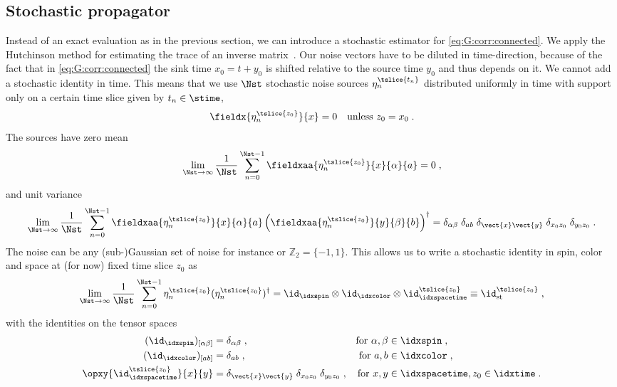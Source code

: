\subsection{Stochastic propagator}
\label{sec:stochastic:prop}

Instead of an exact evaluation as in the previous section, we can introduce a stochastic estimator for \cref{eq:G:corr:connected}.
We apply the Hutchinson method for estimating the trace of an inverse matrix~\cite{Hutchinson01011990,Michael:1998sg}.
Our noise vectors have to be diluted in time-direction, because of the fact that in \cref{eq:G:corr:connected} the sink time $x_0 = t + y_0$ is shifted relative to the source time $y_0$ and thus depends on it.
We cannot add a stochastic identity in time.
This means that we use $\Nst$ stochastic noise sources $\eta_n^{\tslice{t_n}}$ distributed uniformly in time with support only on a certain time slice given by $t_n \in \stime$,
\begin{equation} \label{eq:stoch:time_dilution}
\fieldx{\eta^{\tslice{z_0}}_n}{x} = 0
\quad
\text{unless } z_0 = x_0 \;.
\end{equation}
The sources have zero mean
\begin{equation}
\lim_{\Nst \to \infty}
  \frac{1}{\Nst}
    \sum_{n=0}^{\Nst-1}
      \fieldxaa{\eta^{\tslice{z_0}}_{n}}{x}{\alpha}{a}
 = 0 \;,
\end{equation}
and unit variance
\begin{equation}
\lim_{\Nst \to \infty}
  \frac{1}{\Nst}
    \sum_{n=0}^{\Nst-1}
      \fieldxaa{\eta^{\tslice{z_0}}_{n}}{x}{\alpha}{a}
      \left( \fieldxaa{\eta_n^{\tslice{z_0}}}{y}{\beta}{b} \right)^{\dagger}
=
\delta_{\alpha \beta} \;
\delta_{ab} \;
\delta_{\vect{x} \vect{y}} \;
\delta_{x_0 z_0} \;
\delta_{y_0 z_0} \;.
\end{equation}
The noise can be any (sub-)Gaussian set of noise for instance  or $\mathbb{Z}_2 = \{-1, 1\}$.
This allows us to write a stochastic identity in spin, color and space at (for now) fixed time slice $z_0$ as
\begin{equation} \label{eq:stoch:id}
\lim_{\Nst \to \infty}
  \frac{1}{\Nst}
    \sum_{n=0}^{\Nst-1}
      \eta_n^{\tslice{z_0}}
      (\eta_n^{\tslice{z_0}})^{\dagger}
= \id_{\idxspin} \otimes \id_{\idxcolor} \otimes \id^{\tslice{z_0}}_{\idxspacetime}
\equiv \id^{\tslice{z_0}}_{\text{st}} \;,
\end{equation}
with the identities on the tensor spaces %
\begin{align}
(\id_{\idxspin})_{[\alpha \beta]} &= \delta_{\alpha \beta} \;,
&\text{for } \alpha, \beta &\in \idxspin \;, \\
(\id_{\idxcolor})_{[ab]} &= \delta_{ab} \;,
&\text{for } a, b &\in \idxcolor \;, \\
\opxy{\id^{\tslice{z_0}}_{\idxspacetime}}{x}{y} &= \delta_{\vect{x} \vect{y}} \; \delta_{x_0 z_0} \; \delta_{y_0 z_0} \;,
&\text{for } x, y &\in \idxspacetime, z_0 \in \idxtime \;.
\end{align}
